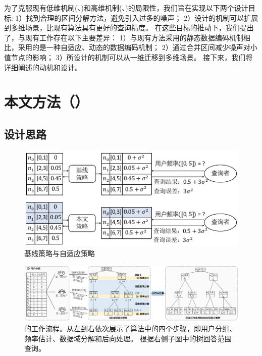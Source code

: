 为了克服现有低维机制(\myhio、\mydht)和高维机制(\mycalm、\myHDG)的局限性，我们旨在实现以下两个设计目标:
1）找到合理的区间分解方法，避免引入过多的噪声；
2）设计的机制可以扩展到多维场景，比现有算法具有更好的查询精度。
在这些目标的推动下，我们提出了\myahead，与现有工作存在以下主要差异：
1）与现有方法采用的静态数据编码机制相比，\myahead 采用的是一种自适应、动态的数据编码机制；
2）\myahead 通过合并区间减少噪声对小值节点的影响；
3）所设计的机制可以从一维迁移到多维场景。
接下来，我们将详细阐述\myahead 的动机和设计。

\section{本文方法（\myahead）}
\label{Adaptive Hierarchical Decomposition}

\subsection{设计思路}
\label{Motivation and Overview}
\begin{figure}[!t]
    \centering
    \includegraphics[width=0.75\hsize]{figure/ldp_range_query/figures_others/Motivation3ch.pdf}
    \caption{基线策略与自适应策略}
    \label{Method Motivation}
\end{figure} 

\begin{figure}[t]
    \centering
    \includegraphics[width=\hsize]{figure/ldp_range_query/figures_others/OverviewAHEAD4ch.pdf}
    \caption{\myahead 的工作流程。从左到右依次展示了\myahead 算法中的四个步骤，即用户分组、频率估计、数据域分解和后向处理。 
    \myahead 根据右侧子图中的树回答范围查询。} 
    \label{fig:ahead-method}   
\end{figure}


